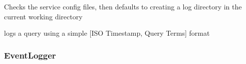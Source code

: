 \documentclass[letterpaper,10pt,english]{sphinxmanual}
\begin{document}
\begin{fulllineitems}
\begin{fulllineitems}
Checks the service config files, then defaults to creating 
a log directory in the current working directory

\end{fulllineitems}


\begin{fulllineitems}
\label{api2.0:puppy.logging.QueryLogger.log}
logs a query using a simple {[}ISO Timestamp, Query Terms{]} format

\end{fulllineitems}


\end{fulllineitems}



\subsubsection{EventLogger}
\label{api2.0:eventlogger}
\end{document}
